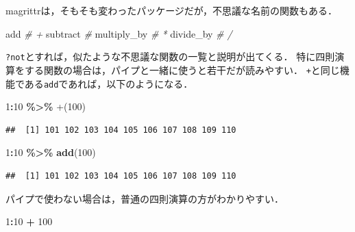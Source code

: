\documentclass[
]{article}
\newenvironment{Shaded}{\begin{snugshade}}{\end{snugshade}}
\newcommand{\AttributeTok}[1]{\textcolor[rgb]{0.13,0.29,0.53}{#1}}
\newcommand{\CommentTok}[1]{\textcolor[rgb]{0.56,0.35,0.01}{\textit{#1}}}
\newcommand{\DecValTok}[1]{\textcolor[rgb]{0.00,0.00,0.81}{#1}}
\newcommand{\FunctionTok}[1]{\textcolor[rgb]{0.13,0.29,0.53}{\textbf{#1}}}
\newcommand{\NormalTok}[1]{#1}
\newcommand{\SpecialCharTok}[1]{\textcolor[rgb]{0.81,0.36,0.00}{\textbf{#1}}}
\newcommand{\StringTok}[1]{\textcolor[rgb]{0.31,0.60,0.02}{#1}}
\begin{document}
magrittrは，そもそも変わったパッケージだが，不思議な名前の関数もある．

\begin{Shaded}
\begin{Highlighting}[]
\NormalTok{add          }\CommentTok{\# \textasciigrave{}+\textasciigrave{}}
\NormalTok{subtract     }\CommentTok{\# \textasciigrave{}{-}\textasciigrave{}}
\NormalTok{multiply\_by  }\CommentTok{\# \textasciigrave{}*\textasciigrave{}}
\NormalTok{divide\_by    }\CommentTok{\# \textasciigrave{}/\textasciigrave{}}
\end{Highlighting}
\end{Shaded}

\texttt{?not}とすれば，似たような不思議な関数の一覧と説明が出てくる．
特に四則演算をする関数の場合は，パイプと一緒に使うと若干だが読みやすい．
\texttt{+}と同じ機能である\texttt{add}であれば，以下のようになる．

\begin{Shaded}
\begin{Highlighting}[]
\DecValTok{1}\SpecialCharTok{:}\DecValTok{10} \SpecialCharTok{\%\textgreater{}\%} 
  \StringTok{\textasciigrave{}}\AttributeTok{+}\StringTok{\textasciigrave{}}\NormalTok{(}\DecValTok{100}\NormalTok{)}
\end{Highlighting}
\end{Shaded}

\begin{verbatim}
##  [1] 101 102 103 104 105 106 107 108 109 110
\end{verbatim}

\begin{Shaded}
\begin{Highlighting}[]
\DecValTok{1}\SpecialCharTok{:}\DecValTok{10} \SpecialCharTok{\%\textgreater{}\%} 
  \FunctionTok{add}\NormalTok{(}\DecValTok{100}\NormalTok{)}
\end{Highlighting}
\end{Shaded}

\begin{verbatim}
##  [1] 101 102 103 104 105 106 107 108 109 110
\end{verbatim}

パイプで使わない場合は，普通の四則演算の方がわかりやすい．

\begin{Shaded}
\begin{Highlighting}[]
\DecValTok{1}\SpecialCharTok{:}\DecValTok{10} \SpecialCharTok{+} \DecValTok{100}
\end{Highlighting}
\end{Shaded}
\end{document}
